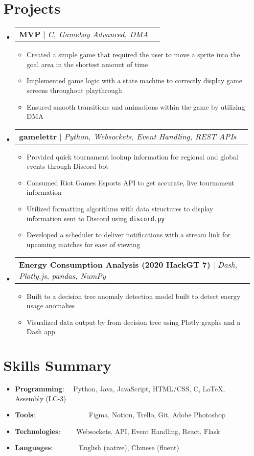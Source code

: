 \documentclass[a4paper,11pt]{extarticle}
\makeatletter
\newcommand{\resumeSkillItem}[2]{
	\item\small{
		\textbf{#1}{: #2 \vspace{-2pt}}
	}
}
\newcommand{\resumeItem}[1]{
	\item\small{
		#1 \vspace{-1pt}
	}
}
\newcommand{\resumeProjectHeading}[3]{
	\vspace{-3pt}\item
		\begin{tabular*}{1\linewidth}{l@{\extracolsep{\fill}}r}
			\textbf{#1} $|$ \emph{#2} & #3 \\
		\end{tabular*}\vspace{-3pt}
}
\newcommand{\resumeSubItem}[2]{\resumeSkillItem{#1}{#2}\vspace{-5pt}}
\newcommand{\resumeSubHeadingListStart}{\begin{itemize}[leftmargin=0.15in,label={}]}
\newcommand{\resumeSubHeadingListEnd}{\end{itemize}}
\newcommand{\resumeItemListStart}{\begin{itemize}\vspace{-3pt}}
\newcommand{\resumeItemListEnd}{\end{itemize}\vspace{-3pt}}
\makeatother
\begin{document}
\section{Projects}
    \resumeSubHeadingListStart
    \vspace{1mm}
        \resumeProjectHeading
            {MVP}
            {C, Gameboy Advanced, DMA}
            {}
            \resumeItemListStart
                \resumeItem{Created a simple game that required the user to move
                    a sprite into the goal area in the shortest amount of time}
                \resumeItem{Implemented game logic with a state machine to correctly
                    display game screens throughout playthrough}
                \resumeItem{Ensured smooth transitions and animations within the game
                    by utilizing DMA}
            \resumeItemListEnd
        \resumeProjectHeading
            {gamelettr}
            {Python, Websockets, Event Handling, REST APIs}
            {}
            \resumeItemListStart
                \resumeItem{Provided quick tournament lookup information for
                    regional and global events through Discord bot}
                \resumeItem{Consumed Riot Games Esports API to get accurate, live
                    tournament information}
                \resumeItem{Utilized formatting algorithms with data structures to
                    display information sent to Discord using \texttt{discord.py}}
                \resumeItem{Developed a scheduler to deliver notifications with
                    a stream link for upcoming matches for ease of viewing}
            \resumeItemListEnd
        \resumeProjectHeading
            {Energy Consumption Analysis (2020 HackGT 7)}
            {Dash, Plotly.js, pandas, NumPy}
            {}
            \resumeItemListStart
                \resumeItem{Built to a decision tree anomaly detection model
                    built to detect energy usage anomalies}
                \resumeItem{Visualized data output by from decision tree using Plotly
                    graphs and a Dash app}
            \resumeItemListEnd
    \resumeSubHeadingListEnd

\section{Skills Summary}
	\resumeSubHeadingListStart
		\resumeSubItem{Programming}
			{\hspace{0.6mm}~~Python, Java, JavaScript, HTML/CSS, C, \LaTeX, Assembly (LC-3)}
		\resumeSubItem{Tools}
            {\hspace{0.3mm}~~~~~~~~~~~~~~~Figma, Notion, Trello, Git, Adobe
                Photoshop}
		\resumeSubItem{Technologies}
			{~~~~Websockets, API, Event Handling, React, Flask}
        \resumeSubItem{Languages}
			{\hspace{0.6mm}~~~~~~~English (native), Chinese (fluent)}
	\resumeSubHeadingListEnd
\end{document}
